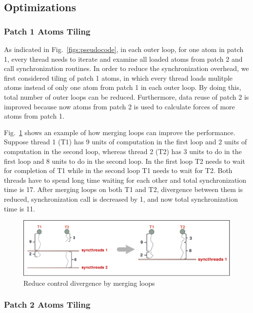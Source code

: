 \subsection{Optimizations}
\subsubsection{Patch 1 Atoms Tiling}

As indicated in Fig.~\ref{figs:pseudocode}, in each outer loop, for one atom in patch 1, every thread needs to iterate and examine all loaded atoms from patch 2
and call synchronization routines. In order to reduce the synchronization overhead, we first considered tiling of patch 1 atoms,
in which every thread loads mulitple atoms instead of only one atom from patch 1 in each outer loop.
By doing this, total number of outer loops can be reduced. Furthermore, data reuse of patch 2 is improved because now atoms from patch 2 is used to calculate
forces of more atoms from patch 1.

Fig.~\ref{figs:divergence} shows an example of how merging loops can improve the performance. Suppose thread 1 (T1) has 9 units of computation in the first loop and 2 units
of computation in the second loop, whereas thread 2 (T2) has 3 units to do in the first loop and 8 units to do in the second loop. In the first loop T2 needs to wait for
completion of T1 while in the second loop T1 needs to wait for T2. Both threads have to spend long time waiting for each other and total synchronization time is 17.
After merging loops on both T1 and T2, divergence between them is reduced, synchronization call is decreased by 1, and now total synchronization time is 11.

\begin{figure}[h]
\centering
\setlength{\abovecaptionskip}{-1pt}
\setlength{\belowcaptionskip}{-5pt}
\includegraphics[width=6.0in]{figs/divergence.eps}
\caption{Reduce control divergence by merging loops}
\label{figs:divergence}
\vspace{-0.5cm}
\end{figure}

\subsubsection{Patch 2 Atoms Tiling}


